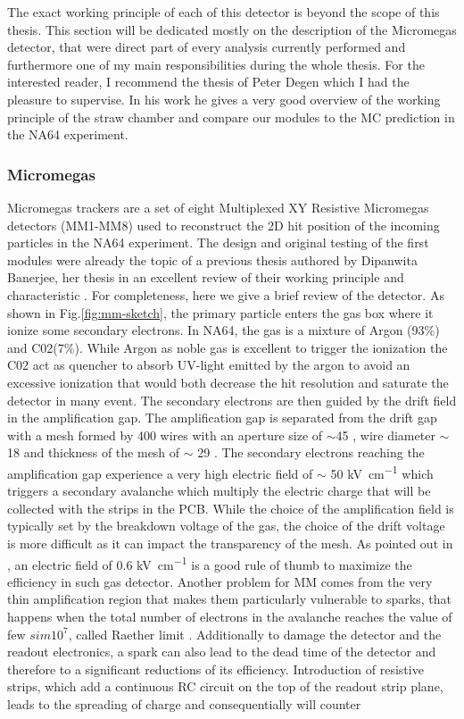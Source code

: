 The exact working principle of each of this detector is beyond the scope of this thesis. This section will be dedicated mostly on the description of the Micromegas detector, that were direct part of every analysis currently performed and furthermore one of my main responsibilities during the whole thesis. For the interested reader, I recommend the thesis of Peter Degen \cite{pdegen-thesis} which I had the pleasure to supervise. In his work he gives a very good overview of the working principle of the straw chamber and compare our modules to the MC prediction in the NA64 experiment.

\subsubsection{Micromegas}

Micromegas trackers are a set of eight Multiplexed XY Resistive Micromegas detectors (MM1-MM8) used to reconstruct the 2D hit position of the incoming particles in the NA64 experiment. The design and original testing of the first modules were already the topic of a previous thesis authored by Dipanwita Banerjee, her thesis in an excellent review of their working principle and characteristic \cite{dbanerjee-thesis}. For completeness, here we give a brief review of the detector. As shown in Fig.\ref{fig:mm-sketch}, the primary particle enters the gas box where it ionize some secondary electrons. In NA64, the gas is a mixture of Argon (93\%) and C02(7\%). While Argon as noble gas is excellent to trigger the ionization the C02 act as quencher to absorb UV-light emitted by the argon to avoid an excessive ionization that would both decrease the hit resolution and saturate the detector in many event. The secondary electrons are then guided by the drift field in the amplification gap. The amplification gap is separated from the drift gap with a mesh formed by 400 wires with an aperture size of $\sim$45 \mum, wire diameter $\sim$18 \mum and thickness of the mesh of $\sim$ 29 \mum. The secondary electrons reaching the amplification gap experience a very high electric field of $\sim$ 50 \si{\kilo\volt\per\centi\metre} which triggers a secondary avalanche which multiply the electric charge that will be collected with the strips in the PCB. While the choice of the amplification field is typically set by the breakdown voltage of the gas, the choice of the drift voltage is more difficult as it can impact the transparency of the mesh. As pointed out in \cite{Bortfeldt:2014vvt}, an electric field of 0.6 \si{\kilo\volt\per\centi\metre} is a good rule of thumb to maximize the efficiency in such gas detector. Another problem for MM comes from the very thin amplification region that makes them particularly vulnerable to sparks,  that happens when the total number of electrons in the avalanche reaches the value of few $sim 10^7$, called Raether limit \cite{BAY2002162,BRESSAN1999321,Raether:102989}. Additionally to damage the detector and the readout electronics, a spark can also lead to the dead time of the detector and therefore to a significant reductions of its efficiency. Introduction of resistive strips, which add a continuous RC circuit on the top of the readout strip plane, leads to the spreading of charge and consequentially will counter 